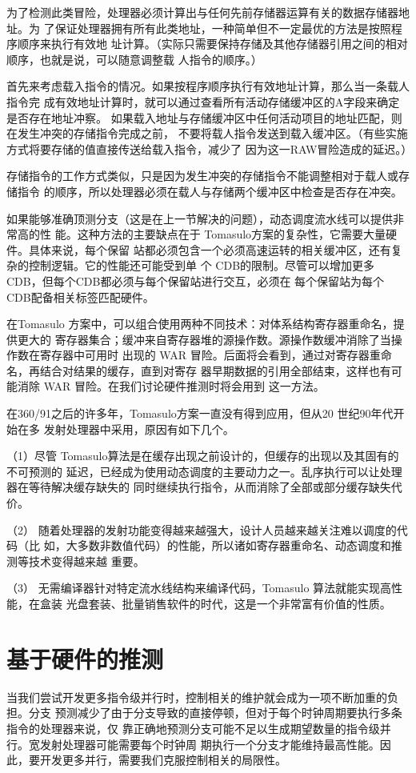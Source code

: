 为了检测此类冒险，处理器必须计算出与任何先前存储器运算有关的数据存储器地址。为
了保证处理器拥有所有此类地址，一种简单但不一定最优的方法是按照程序顺序来执行有效地
址计算。（实际只需要保持存储及其他存储器引用之间的相对顺序，也就是说，可以随意调整载
人指令的顺序。）

首先来考虑载入指令的情况。如果按程序顺序执行有效地址计算，那么当一条载人指令完
成有效地址计算时，就可以通过查看所有活动存储缓冲区的A字段来确定是否存在地址冲察。
如果载入地址与存储缓冲区中任何活动项目的地址匹配，则在发生冲突的存储指令完成之前，
不要将载人指令发送到载入缓冲区。（有些实施方式将要存储的值直接传送给载入指令，减少了
因为这一RAW冒险造成的延迟。）

存储指令的工作方式类似，只是因为发生冲突的存储指令不能调整相对于载人或存储指令
的顺序，所以处理器必须在载人与存储两个缓冲区中检查是否存在冲突。

如果能够准确顶测分支（这是在上一节解决的问题），动态调度流水线可以提供非常高的性
能。这种方法的主要缺点在于 Tomasulo方案的复杂性，它需要大量硬件。具体来说，每个保留
站都必须包含一个必须高速运转的相关缓冲区，还有复杂的控制逻辑。它的性能还可能受到单
个 CDB的限制。尽管可以增加更多 CDB，但每个CDB都必须与每个保留站进行交互，必须在
每个保留站为每个 CDB配备相关标签匹配硬件。

在Tomasulo 方案中，可以组合使用两种不同技术：对体系结构寄存器重命名，提供更大的
寄存器集合；缓冲来自寄存器堆的源操作数。源操作数缓冲消除了当操作数在寄存器中可用时
出现的 WAR 冒险。后面将会看到，通过对寄存器重命名，再结合对结果的缓存，直到对寄存
器早期数据的引用全部结束，这样也有可能消除 WAR 冒险。在我们讨论硬件推测时将会用到
这一方法。

在360/91之后的许多年，Tomasulo方案一直没有得到应用，但从20 世纪90年代开始在多
发射处理器中采用，原因有如下几个。

（1）尽管 Tomasulo算法是在缓存出现之前设计的，但缓存的出现以及其固有的不可预测的
延迟，已经成为使用动态调度的主要动力之一。乱序执行可以让处理器在等待解决缓存缺失的
同时继续执行指令，从而消除了全部或部分缓存缺失代价。

（2） 随着处理器的发射功能变得越来越强大，设计人员越来越关注难以调度的代码（比
如，大多数非数值代码）的性能，所以诸如寄存器重命名、动态调度和推测等技术变得越来越
重要。

（3） 无需编译器针对特定流水线结构来编译代码，Tomasulo 算法就能实现高性能，在盒装
光盘套装、批量销售软件的时代，这是一个非常富有价值的性质。

\section{基于硬件的推测}
当我们尝试开发更多指令级并行时，控制相关的维护就会成为一项不断加重的负担。分支
预测减少了由于分支导致的直接停顿，但对于每个时钟周期要执行多条指令的处理器来说，仅
靠正确地预测分支可能不足以生成期望数量的指令级并行。宽发射处理器可能需要每个时钟周
期执行一个分支才能维持最高性能。因此，要开发更多并行，需要我们克服控制相关的局限性。

